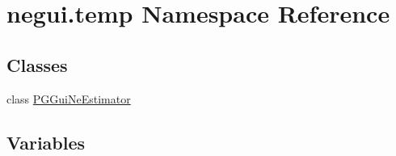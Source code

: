 \hypertarget{namespacenegui_1_1temp}{}\section{negui.\+temp Namespace Reference}
\label{namespacenegui_1_1temp}
\subsection*{Classes}
\begin{DoxyCompactItemize}
\item 
class \hyperlink{classnegui_1_1temp_1_1PGGuiNeEstimator}{P\+G\+Gui\+Ne\+Estimator}
\end{DoxyCompactItemize}
\subsection*{Variables}
